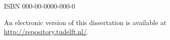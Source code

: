 \begin{titlepage}
\vspace{4\bigskipamount}



\medskip
\noindent ISBN 000-00-0000-000-0

\medskip
\noindent An electronic version of this dissertation is available at \\
\url{http://repository.tudelft.nl/}.

\end{titlepage}

